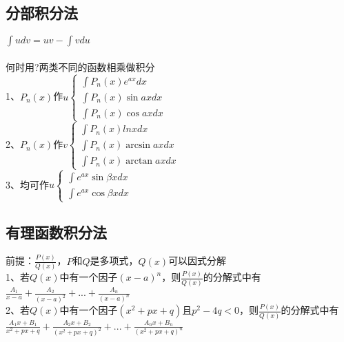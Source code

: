 \documentclass{article}
\begin{document}
\begin{flushleft}
	\subsection{分部积分法}
	
	$\int udv=uv-\int vdu$\\
	~\\
	何时用?两类不同的函数相乘做积分\\
	1、$P_n(x)$作$u \left\{
	\begin{array}{lcl}
	\int P_n(x)e^{ax}dx\\
	\int P_n(x)\sin axdx\\
	\int P_n(x)\cos axdx
	\end{array} \right.$\\
	2、$P_n(x)$作$v \left\{
	\begin{array}{lcl}
	\int P_n(x)lnxdx\\
	\int P_n(x)\arcsin axdx\\
	\int P_n(x)\arctan axdx
	\end{array} \right.$\\
	3、均可作$u \left\{
	\begin{array}{lcl}
	\int e^{ax}\sin \beta xdx\\
	\int e^{ax}\cos \beta xdx
	\end{array} \right.$\\
	
	\subsection{有理函数积分法}
	
	前提：$\frac{P(x)}{Q(x)}$，$P$和$Q$是多项式，$Q(x)$可以因式分解\\
	1、若$Q(x)$中有一个因子$(x-a)^n$，则$\frac{P(x)}{Q(x)}$的分解式中有$\frac{A_1}{x-a}+\frac{A_2}{(x-a)^2}+...+\frac{A_n}{(x-a)^n}$\\
	2、若$Q(x)$中有一个因子$(x^2+px+q)$且$p^2-4q<0$，则$\frac{P(x)}{Q(x)}$的分解式中有$\frac{A_1x+B_1}{x^2+px+q}+\frac{A_2x+B_2}{(x^2+px+q)^2}+...+\frac{A_nx+B_n}{(x^2+px+q)^n}$\\
\end{flushleft}
\end{document}
